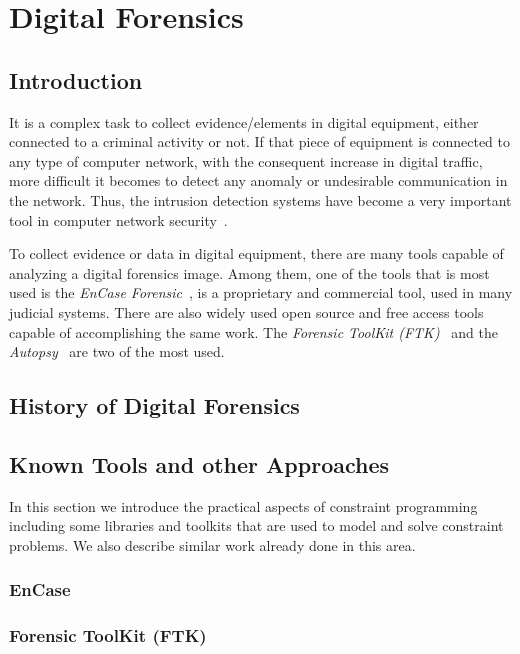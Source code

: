 \chapter{Digital Forensics}

\section{Introduction}

It is a complex task to collect evidence/elements in digital equipment, either connected to a criminal activity or not. If that piece of equipment is connected to any type of computer network, with the consequent increase in digital traffic, more difficult it becomes to detect any anomaly or undesirable communication in the network. Thus, the intrusion detection systems have become a very important tool in computer network security~\cite{Salgueiro2011}. 

To collect evidence or data in digital equipment, there are many tools capable of analyzing a digital forensics image. Among them, one of the tools that is most used is the \textit{EnCase Forensic}~\cite{EnCase}, is a proprietary and commercial tool, used in many judicial systems. There are also widely used open source and free access tools capable of accomplishing the same work. The \textit{Forensic ToolKit (FTK)}~\cite{FTK} and the \textit{Autopsy}~\cite{Autopsy} are two of the most used.

\section{History of Digital Forensics}

\section{Known Tools and other Approaches}

In this section we introduce the practical aspects of constraint programming including some libraries and toolkits that are used to model and solve constraint problems. We also describe similar work already done in this area.

\subsection{EnCase}

\subsection{Forensic ToolKit (FTK)}

